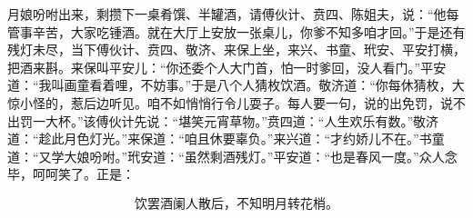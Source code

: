 月娘吩咐出来，剩攒下一桌肴馔、半罐酒，请傅伙计、贲四、陈姐夫，说：“他每管事辛苦，大家吃锺酒。就在大厅上安放一张桌儿，你爹不知多咱才回。”于是还有残灯未尽，当下傅伙计、贲四、敬济、来保上坐，来兴、书童、玳安、平安打横，把酒来斟。来保叫平安儿：“你还委个人大门首，怕一时爹回，没人看门。”平安道：“我叫画童看着哩，不妨事。”于是八个人猜枚饮酒。敬济道：“你每休猜枚，大惊小怪的，惹后边听见。咱不如悄悄行令儿耍子。每人要一句，说的出免罚，说不出罚一大杯。”该傅伙计先说：“堪笑元宵草物。”贲四道：“人生欢乐有数。”敬济道：“趁此月色灯光。”来保道：“咱且休要辜负。”来兴道：“才约娇儿不在。”书童道：“又学大娘吩咐。”玳安道：“虽然剩酒残灯。”平安道：“也是春风一度。”众人念毕，呵呵笑了。正是：

\[
饮罢酒阑人散后，不知明月转花梢。
\]
